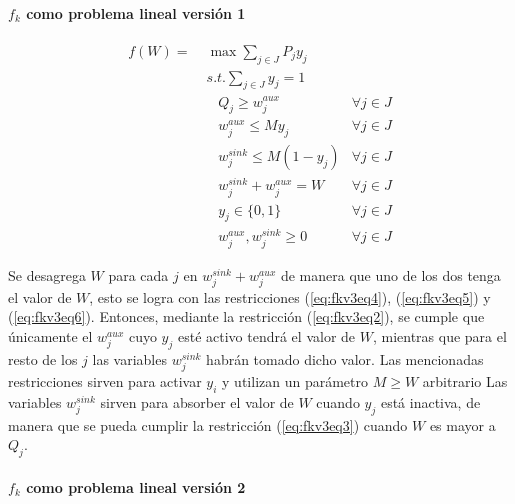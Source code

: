 \clearpage
\paragraph*{$f_k$ como problema lineal versión 1}

\begin{align}
  f(W) =\; & \max \sum_{j \in J} P_j y_j             & \label{eq:fkv3eq1}\\
           & s.t. \sum_{j \in J} y_j = 1            & \label{eq:fkv3eq2}\\
           & \;\;\; Q_j \geq w^{aux}_j              & \forall j \in J \label{eq:fkv3eq3} \\
           & \;\;\; w^{aux}_j \leq M y_j            & \forall j \in J \label{eq:fkv3eq4} \\
           & \;\;\; w^{sink}_j \leq M (1 - y_j)     & \forall j \in J \label{eq:fkv3eq5} \\
           & \;\;\; w^{sink}_j + w^{aux}_j = W      & \label{eq:fkv3eq6} \forall j \in J\\
           & \;\;\; y_j \in \{0,1\}                 & \label{eq:fkv3domainy} \forall j \in J \\
           & \;\;\; w^{aux}_j, w^{sink}_j \geq 0    & \label{eq:fkv3eq7} \forall j \in J
\end{align}

Se desagrega $W$ para cada $j$ en $w^{sink}_j + w^{aux}_j$ de manera que uno de los dos tenga el valor de $W$, esto se logra con las restricciones (\ref{eq:fkv3eq4}), (\ref{eq:fkv3eq5}) y (\ref{eq:fkv3eq6}). Entonces, mediante la restricción (\ref{eq:fkv3eq2}), se cumple que únicamente el $w^{aux}_j$ cuyo $y_j$ esté activo tendrá el valor de $W$, mientras que para el resto de los $j$ las variables $w^{sink}_j$ habrán tomado dicho valor. Las mencionadas restricciones sirven para activar $y_i$ y utilizan un parámetro $M \geq W$ arbitrario Las variables $w^{sink}_j$ sirven para absorber el valor de $W$ cuando $y_j$ está inactiva, de manera que se pueda cumplir la restricción (\ref{eq:fkv3eq3}) cuando $W$ es mayor a $Q_j$.

\paragraph*{$f_k$ como problema lineal versión 2}


